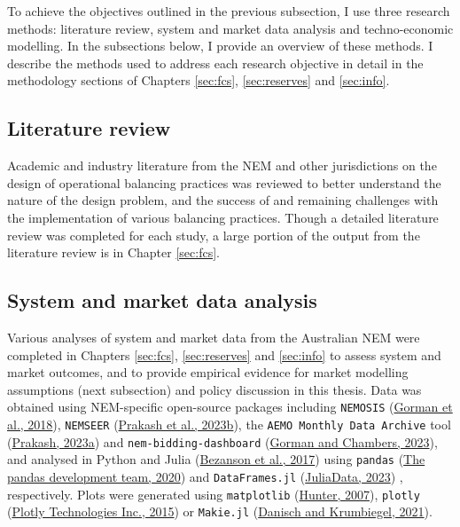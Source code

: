 \documentclass[12pt,a4paper,]{report}
\begin{document}
To achieve the objectives outlined in the previous subsection, I use
three research methods: literature review, system and market data
analysis and techno-economic modelling. In the subsections below, I
provide an overview of these methods. I describe the methods used to
address each research objective in detail in the methodology sections of
Chapters \ref{sec:fcs}, \ref{sec:reserves} and \ref{sec:info}.

\hypertarget{literature-review}{%
\subsection{Literature review}\label{literature-review}}

Academic and industry literature from the NEM and other jurisdictions on
the design of operational balancing practices was reviewed to better
understand the nature of the design problem, and the success of and
remaining challenges with the implementation of various balancing
practices. Though a detailed literature review was completed for each
study, a large portion of the output from the literature review is in
Chapter \ref{sec:fcs}.

\hypertarget{system-and-market-data-analysis}{%
\subsection{System and market data
analysis}\label{system-and-market-data-analysis}}

Various analyses of system and market data from the Australian NEM were
completed in Chapters \ref{sec:fcs}, \ref{sec:reserves} and
\ref{sec:info} to assess system and market outcomes, and to provide
empirical evidence for market modelling assumptions (next subsection)
and policy discussion in this thesis. Data was obtained using
NEM-specific open-source packages including \texttt{NEMOSIS}
(\protect\hyperlink{ref-gormanNEMOSISNEMOpen2018}{Gorman et al., 2018}),
\texttt{NEMSEER}
(\protect\hyperlink{ref-prakashNEMSEERPythonPackage2023}{Prakash et al.,
2023b}), the \texttt{AEMO\ Monthly\ Data\ Archive} tool
(\protect\hyperlink{ref-prakashAEMOMonthlyData2023}{Prakash, 2023a}) and
\texttt{nem-bidding-dashboard}
(\protect\hyperlink{ref-gormanNembiddingdashboard2023}{Gorman and
Chambers, 2023}), and analysed in Python and Julia
(\protect\hyperlink{ref-bezansonJuliaFreshApproach2017}{Bezanson et al.,
2017}) using \texttt{pandas}
(\protect\hyperlink{ref-reback2020pandas}{The pandas development team,
2020}) and \texttt{DataFrames.jl}
(\protect\hyperlink{ref-juliadataDataFramesJl2023}{JuliaData, 2023}) ,
respectively. Plots were generated using \texttt{matplotlib}
(\protect\hyperlink{ref-hunterMatplotlib2DGraphics2007}{Hunter, 2007}),
\texttt{plotly}
(\protect\hyperlink{ref-plotlytechnologiesinc.CollaborativeDataScience2015}{Plotly
Technologies Inc., 2015}) or \texttt{Makie.jl}
(\protect\hyperlink{ref-danischMakieJlFlexible2021}{Danisch and
Krumbiegel, 2021}).
\end{document}

